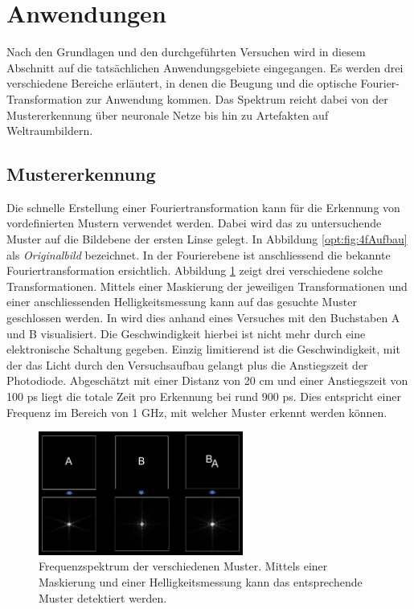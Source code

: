 %
%
%
%
\section{Anwendungen}
\label{opt:section:anwendungen}

Nach den Grundlagen und den durchgeführten Versuchen wird in diesem Abschnitt auf die tatsächlichen Anwendungsgebiete eingegangen.
Es werden drei verschiedene Bereiche erläutert, in denen die Beugung und die optische Fourier-Transformation zur Anwendung kommen.
Das Spektrum reicht dabei von der Mustererkennung über neuronale Netze bis hin zu Artefakten auf Weltraumbildern.

\subsection{Mustererkennung}
Die schnelle Erstellung einer Fouriertransformation kann für die Erkennung von vordefinierten Mustern verwendet werden.
Dabei wird das zu untersuchende Muster auf die Bildebene der ersten Linse gelegt. 
In Abbildung \ref{opt:fig:4fAufbau} als \emph{Originalbild} bezeichnet.
In der Fourierebene ist anschliessend die bekannte Fouriertransformation ersichtlich.
Abbildung \ref{opt:fig:patternYT} zeigt drei verschiedene solche Transformationen.
Mittels einer Maskierung der jeweiligen Transformationen und einer anschliessenden Helligkeitsmessung kann auf das gesuchte Muster geschlossen werden.
In \cite{opt:YT:PatternRecognition} wird dies anhand eines Versuches mit den Buchstaben A und B visualisiert.
Die Geschwindigkeit hierbei ist nicht mehr durch eine elektronische Schaltung gegeben.
Einzig limitierend ist die Geschwindigkeit, mit der das Licht durch den Versuchsaufbau gelangt plus die Anstiegszeit der Photodiode.
Abgeschätzt mit einer Distanz von 20 cm und einer Anstiegszeit von 100 ps liegt die totale Zeit pro Erkennung bei rund 900 ps.
Dies entspricht einer Frequenz im Bereich von 1 GHz, mit welcher Muster erkennt werden können.

\begin{figure}
    \centering
    \includegraphics[width=0.6\textwidth]{papers/opt/images/pattern_YT.png}
    \caption{Frequenzspektrum der verschiedenen Muster. 
    Mittels einer Maskierung und einer Helligkeitsmessung kann das entsprechende Muster detektiert werden.}
    \label{opt:fig:patternYT}
\end{figure}

